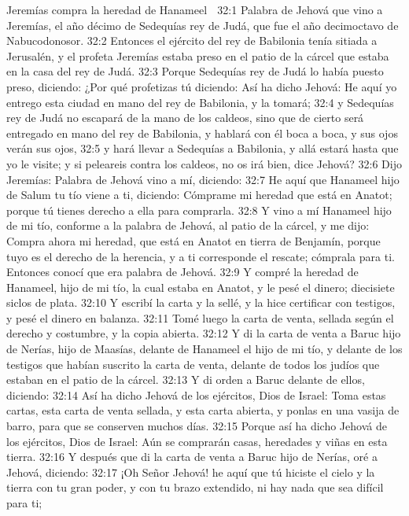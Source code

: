 Jeremías compra la heredad de Hanameel  

32:1 Palabra de Jehová que vino a Jeremías, el año décimo de Sedequías rey de Judá, que fue el año decimoctavo de Nabucodonosor.  
32:2 Entonces el ejército del rey de Babilonia tenía sitiada a Jerusalén, y el profeta Jeremías estaba preso en el patio de la cárcel que estaba en la casa del rey de Judá.  
32:3 Porque Sedequías rey de Judá lo había puesto preso, diciendo: ¿Por qué profetizas tú diciendo: Así ha dicho Jehová: He aquí yo entrego esta ciudad en mano del rey de Babilonia, y la tomará;  
32:4 y Sedequías rey de Judá no escapará de la mano de los caldeos, sino que de cierto será entregado en mano del rey de Babilonia, y hablará con él boca a boca, y sus ojos verán sus ojos,  
32:5 y hará llevar a Sedequías a Babilonia, y allá estará hasta que yo le visite; y si peleareis contra los caldeos, no os irá bien, dice Jehová?  
32:6 Dijo Jeremías: Palabra de Jehová vino a mí, diciendo:  
32:7 He aquí que Hanameel hijo de Salum tu tío viene a ti, diciendo: Cómprame mi heredad que está en Anatot; porque tú tienes derecho a ella para comprarla.  
32:8 Y vino a mí Hanameel hijo de mi tío, conforme a la palabra de Jehová, al patio de la cárcel, y me dijo: Compra ahora mi heredad, que está en Anatot en tierra de Benjamín, porque tuyo es el derecho de la herencia, y a ti corresponde el rescate; cómprala para ti. Entonces conocí que era palabra de Jehová.  
32:9 Y compré la heredad de Hanameel, hijo de mi tío, la cual estaba en Anatot, y le pesé el dinero; diecisiete siclos de plata.  
32:10 Y escribí la carta y la sellé, y la hice certificar con testigos, y pesé el dinero en balanza.  
32:11 Tomé luego la carta de venta, sellada según el derecho y costumbre, y la copia abierta.  
32:12 Y di la carta de venta a Baruc hijo de Nerías, hijo de Maasías, delante de Hanameel el hijo de mi tío, y delante de los testigos que habían suscrito la carta de venta, delante de todos los judíos que estaban en el patio de la cárcel.  
32:13 Y di orden a Baruc delante de ellos, diciendo:  
32:14 Así ha dicho Jehová de los ejércitos, Dios de Israel: Toma estas cartas, esta carta de venta sellada, y esta carta abierta, y ponlas en una vasija de barro, para que se conserven muchos días.  
32:15 Porque así ha dicho Jehová de los ejércitos, Dios de Israel: Aún se comprarán casas, heredades y viñas en esta tierra.  
32:16 Y después que di la carta de venta a Baruc hijo de Nerías, oré a Jehová, diciendo:  
32:17 ¡Oh Señor Jehová! he aquí que tú hiciste el cielo y la tierra con tu gran poder, y con tu brazo extendido, ni hay nada que sea difícil para ti;  
